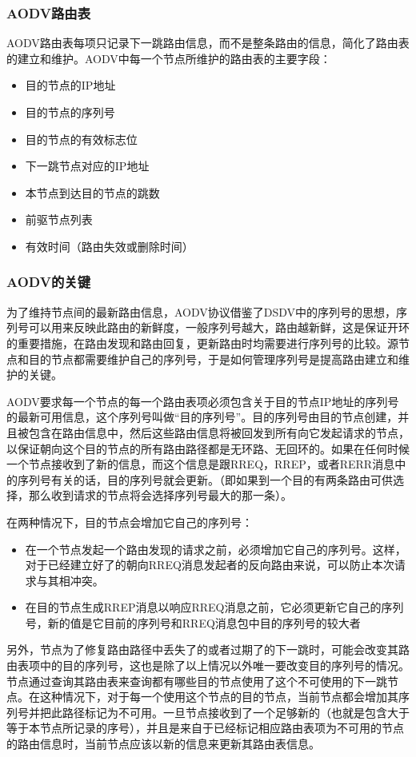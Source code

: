 \documentclass[12pt,a4paper]{article}
\begin{document}
\subsubsection{AODV路由表}
AODV路由表每项只记录下一跳路由信息，而不是整条路由的信息，简化了路由表的建立和维护。AODV中每一个节点所维护的路由表的主要字段：
\begin{itemize}
\item 目的节点的IP地址
\item 目的节点的序列号
\item 目的节点的有效标志位
\item 下一跳节点对应的IP地址
\item 本节点到达目的节点的跳数
\item 前驱节点列表
\item 有效时间（路由失效或删除时间）
\end{itemize}

\subsubsection{AODV的关键}
为了维持节点间的最新路由信息，AODV协议借鉴了DSDV中的序列号的思想，序列号可以用来反映此路由的新鲜度，一般序列号越大，路由越新鲜，这是保证开环的重要措施，在路由发现和路由回复，更新路由时均需要进行序列号的比较。源节点和目的节点都需要维护自己的序列号，于是如何管理序列号是提高路由建立和维护的关键。

AODV要求每一个节点的每一个路由表项必须包含关于目的节点IP地址的序列号的最新可用信息，这个序列号叫做“目的序列号”。目的序列号由目的节点创建，并且被包含在路由信息中，然后这些路由信息将被回发到所有向它发起请求的节点，以保证朝向这个目的节点的所有路由路径都是无环路、无回环的。如果在任何时候一个节点接收到了新的信息，而这个信息是跟RREQ，RREP，或者RERR消息中的序列号有关的话，目的序列号就会更新。（即如果到一个目的有两条路由可供选择，那么收到请求的节点将会选择序列号最大的那一条）。

在两种情况下，目的节点会增加它自己的序列号：
\begin{itemize}
\item 在一个节点发起一个路由发现的请求之前，必须增加它自己的序列号。这样，对于已经建立好了的朝向RREQ消息发起者的反向路由来说，可以防止本次请求与其相冲突。
\item 在目的节点生成RREP消息以响应RREQ消息之前，它必须更新它自己的序列号，新的值是它目前的序列号和RREQ消息包中目的序列号的较大者
\end{itemize}

另外，节点为了修复路由路径中丢失了的或者过期了的下一跳时，可能会改变其路由表项中的目的序列号，这也是除了以上情况以外唯一要改变目的序列号的情况。节点通过查询其路由表来查询都有哪些目的节点使用了这个不可使用的下一跳节点。在这种情况下，对于每一个使用这个节点的目的节点，当前节点都会增加其序列号并把此路径标记为不可用。一旦节点接收到了一个足够新的（也就是包含大于等于本节点所记录的序号），并且是来自于已经标记相应路由表项为不可用的节点的路由信息时，当前节点应该以新的信息来更新其路由表信息。
\end{document}
